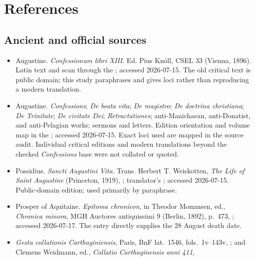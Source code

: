 \section{References}\label{sec:aug-references}

\subsection{Ancient and official sources}

\begin{itemize}
\item Augustine. \emph{Confessionum libri XIII}. Ed. Pius Knöll, CSEL 33
(Vienna, 1896). Latin text and scan through the
; accessed 2026-07-15. The old critical text is public domain;
this study paraphrases and gives loci rather than reproducing a modern
translation.
\item Augustine. \emph{Confessions}; \emph{De beata vita};
\emph{De magistro}; \emph{De doctrina christiana}; \emph{De Trinitate};
\emph{De civitate Dei}; \emph{Retractationes}; anti-Manichaean,
anti-Donatist, and anti-Pelagian works; sermons and letters. Edition
  orientation and volume map in the
; accessed
  2026-07-15. Exact loci used are mapped in the source audit. Individual
  critical editions and modern translations beyond the checked
  \emph{Confessions} base were not collated or quoted.
\item Possidius. \emph{Sancti Augustini Vita}. Trans. Herbert T. Weiskotten,
\emph{The Life of Saint Augustine} (Princeton, 1919),
; translator's
;
accessed 2026-07-15. Public-domain edition; used primarily by paraphrase.
\item Prosper of Aquitaine. \emph{Epitoma chronicon}, in Theodor Mommsen,
ed., \emph{Chronica minora}, MGH Auctores antiquissimi 9 (Berlin, 1892),
p.~473,
; accessed 2026-07-17. The entry directly supplies the 28 August death date.
\item \emph{Gesta collationis Carthaginiensis}, Paris, BnF lat.~1546,
fols.~1v--143v,
; and Clemens Weidmann, ed., \emph{Collatio Carthaginensis anni 411},

\end{itemize}

